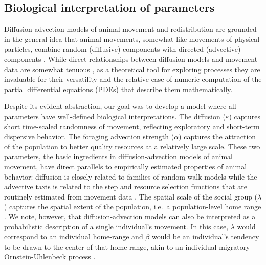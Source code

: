 \documentclass[utf8]{frontiersSCNS} %
\begin{document}
	
\subsection{Biological interpretation of parameters}
	
	Diffusion-advection models of animal movement and redistribution are grounded in the general idea that animal movements, somewhat like movements of physical particles, combine random (diffusive) components with directed (advective) components \citep{Skellam1951, Turchin1998, Okubo2001}. While direct relationships between diffusion models and movement data are somewhat tenuous \citep{Gurarie2011,Potts2020}, as a theoretical tool for exploring processes they are invaluable for their versatility and the relative ease of numeric computation of the partial differential equations (PDEs) that describe them mathematically. %
	
	Despite its evident abstraction, our goal was to develop a model where all parameters have well-defined biological interpretations. The diffusion ($\varepsilon$) captures short time-scaled randomness of movement, reflecting exploratory and short-term dispersive behavior. The foraging advection strength ($\alpha$) captures the attraction of the population to better quality resources at a relatively large scale. These two parameters, the basic ingredients in diffusion-advection models of animal movement, have direct parallels to empirically estimated properties of animal behavior: diffusion is closely related to families of random walk models \citep{Gurarie2011} while the advective taxis is related to the step and resource selection functions that are routinely estimated from movement data \citep{Potts2020}. The spatial scale of the social group ($\lambda$) captures the spatial extent of the population, i.e.~a population-level home range \citep{Noonan2019}. We note, however, that diffusion-advection models can also be interpreted as a probabilistic description of a single individual's movement. In this case, $\lambda$ would correspond to an individual home-range and $\beta$ would be an individual's tendency to be drawn to the center of that home range, akin to an individual migratory Ornstein-Uhlenbeck process \citep{Gurarie2017}.
	
\end{document}
